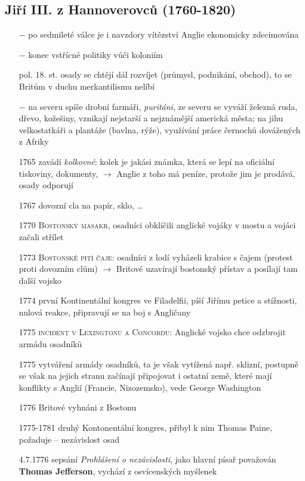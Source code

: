 \documentclass{article}
\begin{document}
\subsection*{Jiří III. z Hannoverovců (1760-1820)}
\begin{itemize}
    \vspace{-0.5em}
    \setlength\itemsep{0.15em}
    \item[$-$] po sedmileté válce je i navzdory vítězství Anglie ekonomicky zdecimována
    \item[$-$] konec vstřícné politiky vůči koloniím
    \item[pol. 18. st.] osady se chtějí dál rozvíjet (průmysl, podnikání, obchod), to se Britům v duchu merkantilismu nelíbí
    \item[$-$]  na severu spíše drobní farmáři, \textit{puritáni}, ze severu se vyváží železná ruda, dřevo, kožešiny, vznikají nejstarší a nejznámější americká města; na jihu velkostatkáři a plantáže (bavlna, rýže), využívání práce černochů dovážených z Afriky
    \item[1765] zavádí \textit{kolkovné}: kolek je jakási známka, která se lepí na oficiální tiskoviny, dokumenty, $\rightarrow$ Anglie z toho má peníze, protože jim je prodává, osady odporují
    \item[1767] dovozní cla na papír, sklo, \dots
    \item[1770] \textsc{Bostonský masakr}, osadníci obklíčili anglické vojáky v mostu a vojáci začali střílet
    \item[1773] \textsc{Bostonské pití čaje}: osadníci z lodí vyházeli krabice s čajem (protest proti dovozním clům) $\rightarrow$ Britové uzavírají bostonský přístav a posílají tam další vojsko
    \item[1774] první Kontinentální kongres ve Filadelfii, píší Jiřímu petice a stížnosti, nulová reakce, připravují se na boj s Angličany
    \item[1775] \textsc{incident v Lexingtonu a Concordu}: Anglické vojsko chce odzbrojit armádu osadníků
    \item[1775] vytváření armády osadníků, ta je však vytížená např. sklizní, postupně se však na jejich stranu začínají připojovat i ostatní země, které mají konflikty s Anglií (Francie, Nizozemsko), vede George Washington
    \item[1776] Britové vyhnáni z Bostonu
    \item[1775-1781] druhý Kontonentální kongres, přibyl k nim Thomas Paine, požaduje  -- nezávislost osad
    \item[4.7.1776] sepsání \textit{Prohlášení o nezávislosti}, jako hlavní písař považován \textbf{Thomas Jefferson}, vychází z osvícenských myšlenek

\end{itemize}
\end{document}
